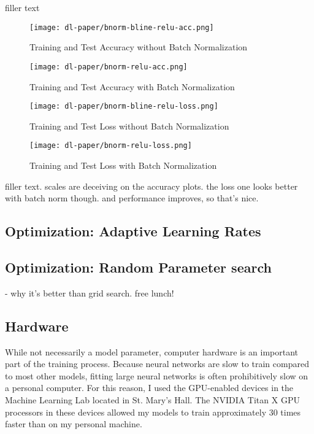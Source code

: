 \documentclass[12pt]{article}  %
\theoremstyle{definition}
\theoremstyle{remark}
\begin{document}
\par filler text 

\begin{figure}[!htb]
  \texttt{[image: dl-paper/bnorm-bline-relu-acc.png]}
  \caption{Training and Test Accuracy without Batch Normalization}\label{no-bn-acc}
\endminipage\hfill
{}
  \texttt{[image: dl-paper/bnorm-relu-acc.png]}
  \caption{Training and Test Accuracy with Batch Normalization}\label{bn-acc}
\endminipage\hfill
\end{figure}

\begin{figure}[!htb]
  \texttt{[image: dl-paper/bnorm-bline-relu-loss.png]}
  \caption{Training and Test Loss without Batch Normalization}\label{no-bn-loss}
\endminipage\hfill
{}
  \texttt{[image: dl-paper/bnorm-relu-loss.png]}
  \caption{Training and Test Loss with Batch Normalization}\label{bn-loss}
\endminipage\hfill
\end{figure}

\par filler text. scales are deceiving on the accuracy plots. the loss one looks better with batch norm though. and performance improves, so that's nice. 

\subsection{Optimization: Adaptive Learning Rates}
\subsection{Optimization: Random Parameter search}
- why it's better than grid search. free lunch!
\subsection{Hardware}
\par While not necessarily a model parameter, computer hardware is an important part of the training process. Because neural networks are slow to train compared to most other models, fitting large neural networks is often prohibitively slow on a personal computer. For this reason, I used the GPU-enabled devices in the Machine Learning Lab located in St. Mary's Hall. The NVIDIA Titan X GPU processors in these devices allowed my models to train approximately 30 times faster than on my personal machine. 
\end{document}
